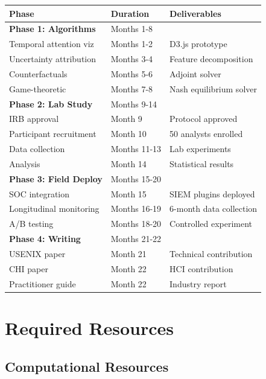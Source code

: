 \documentclass[11pt]{article}
\begin{document}
\begin{table}[h]
\centering
\small
\begin{tabular}{|l|l|l|}
\hline
\textbf{Phase} & \textbf{Duration} & \textbf{Deliverables} \\
\hline
\textbf{Phase 1: Algorithms} & Months 1-8 & \\
\quad Temporal attention viz & Months 1-2 & D3.js prototype \\
\quad Uncertainty attribution & Months 3-4 & Feature decomposition \\
\quad Counterfactuals & Months 5-6 & Adjoint solver \\
\quad Game-theoretic & Months 7-8 & Nash equilibrium solver \\
\hline
\textbf{Phase 2: Lab Study} & Months 9-14 & \\
\quad IRB approval & Month 9 & Protocol approved \\
\quad Participant recruitment & Month 10 & 50 analysts enrolled \\
\quad Data collection & Months 11-13 & Lab experiments \\
\quad Analysis & Month 14 & Statistical results \\
\hline
\textbf{Phase 3: Field Deploy} & Months 15-20 & \\
\quad SOC integration & Month 15 & SIEM plugins deployed \\
\quad Longitudinal monitoring & Months 16-19 & 6-month data collection \\
\quad A/B testing & Months 18-20 & Controlled experiment \\
\hline
\textbf{Phase 4: Writing} & Months 21-22 & \\
\quad USENIX paper & Month 21 & Technical contribution \\
\quad CHI paper & Month 22 & HCI contribution \\
\quad Practitioner guide & Month 22 & Industry report \\
\hline
\end{tabular}
\end{table}

\section{Required Resources}

\subsection{Computational Resources}
\end{document}
